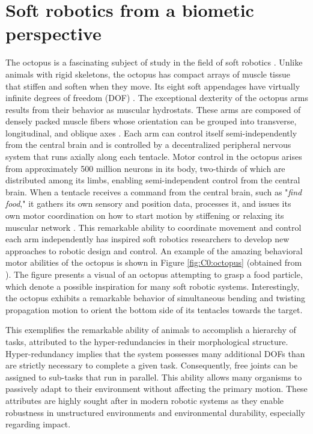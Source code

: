 \section{Soft robotics from a biometic perspective}
The octopus is a fascinating subject of study in the field of soft robotics \cite{Renda2018,Wehner2016,Kim2019Aug,Laschi2014,Rus2015,Mochiyama1999,Chang2022}. Unlike animals with rigid skeletons, the octopus has compact arrays of muscle tissue that stiffen and soften when they move. Its eight soft appendages have virtually infinite degrees of freedom (DOF) \cite{Sumbre2001Sep,Kier1985,Kennedy2020Nov}. The exceptional dexterity of the octopus arms results from their behavior as muscular hydrostats. These arms are composed of densely packed muscle fibers whose orientation can be grouped into transverse, longitudinal, and oblique axes \cite{Kier2007Oct}. Each arm can control itself semi-independently from the central brain and is controlled by a decentralized peripheral nervous system that runs axially along each tentacle. Motor control in the octopus arises from approximately 500 million neurons in its body, two-thirds of which are distributed among its limbs, enabling semi-independent control from the central brain. When a tentacle receives a command from the central brain, such as "\textit{find food}," it gathers its own sensory and position data, processes it, and issues its own motor coordination on how to start motion by stiffening or relaxing its muscular network \cite{Kier1985,Sumbre2001Sep}. This remarkable ability to coordinate movement and control each arm independently has inspired soft robotics researchers to develop new approaches to robotic design and control. An example of the amazing behavioral motor abilities of the octopus is shown in Figure \ref{fig:C0:octopus} (obtained from \cite{Sumbre2001Sep}). The figure presents a visual of an octopus attempting to grasp a food particle, which denote a possible inspiration for many soft robotic systems. Interestingly, the octopus exhibits a remarkable behavior of simultaneous bending and twisting propagation motion to orient the bottom side of its tentacles towards the target. 

This exemplifies the remarkable ability of animals to accomplish a hierarchy of tasks, attributed to the hyper-redundancies in their morphological structure. Hyper-redundancy \cite{Chirikjian1989,Chirikjian1991,Rus2015} implies that the system possesses many additional DOFs than are strictly necessary to complete a given task. Consequently, free joints can be assigned to sub-tasks that run in parallel. This ability allows many organisms to passively adapt to their environment without affecting the primary motion. These attributes are highly sought after in modern robotic systems \cite{Spong1996,Murray1994,DeLuca2016Jul} as they enable robustness in unstructured environments and environmental durability, especially regarding impact.

